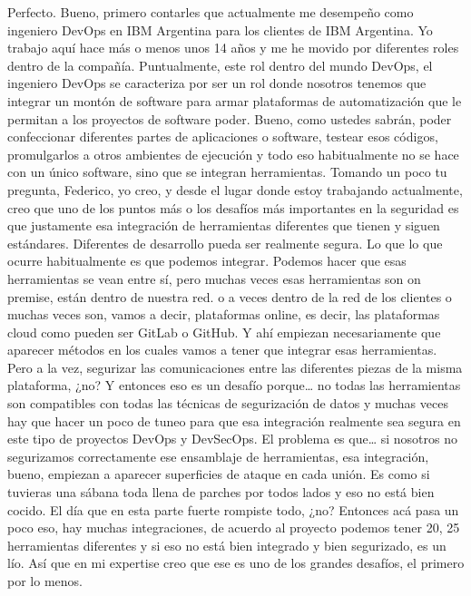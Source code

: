 \begin{description}[leftmargin=0cm, labelsep=0.5cm]
    \item[\textbf{VILLARINO PABLO RODOLFO:}] Perfecto. Bueno, primero contarles que actualmente me desempeño como ingeniero DevOps en IBM Argentina para los clientes de IBM Argentina. Yo trabajo aquí hace más o menos unos 14 años y me he movido por diferentes roles dentro de la compañía. Puntualmente, este rol dentro del mundo DevOps, el ingeniero DevOps se caracteriza por ser un rol donde nosotros tenemos que integrar un montón de software para armar plataformas de automatización que le permitan a los proyectos de software poder. Bueno, como ustedes sabrán, poder confeccionar diferentes partes de aplicaciones o software, testear esos códigos, promulgarlos a otros ambientes de ejecución y todo eso habitualmente no se hace con un único software, sino que se integran herramientas. Tomando un poco tu pregunta, Federico, yo creo, y desde el lugar donde estoy trabajando actualmente, creo que uno de los puntos más o los desafíos más importantes en la seguridad es que justamente esa integración de herramientas diferentes que tienen y siguen estándares. Diferentes de desarrollo pueda ser realmente segura. Lo que lo que ocurre habitualmente es que podemos integrar. Podemos hacer que esas herramientas se vean entre sí, pero muchas veces esas herramientas son on premise, están dentro de nuestra red. o a veces dentro de la red de los clientes o muchas veces son, vamos a decir, plataformas online, es decir, las plataformas cloud como pueden ser GitLab o GitHub. Y ahí empiezan necesariamente que aparecer métodos en los cuales vamos a tener que integrar esas herramientas. Pero a la vez, segurizar las comunicaciones entre las diferentes piezas de la misma plataforma, ¿no? Y entonces eso es un desafío porque… no todas las herramientas son compatibles con todas las técnicas de segurización de datos y muchas veces hay que hacer un poco de tuneo para que esa integración realmente sea segura en este tipo de proyectos DevOps y DevSecOps. El problema es que… si nosotros no segurizamos correctamente ese ensamblaje de herramientas, esa integración, bueno, empiezan a aparecer superficies de ataque en cada unión. Es como si tuvieras una sábana toda llena de parches por todos lados y eso no está bien cocido. El día que en esta parte fuerte rompiste todo, ¿no? Entonces acá pasa un poco eso, hay muchas integraciones, de acuerdo al proyecto podemos tener 20, 25 herramientas diferentes y si eso no está bien integrado y bien segurizado, es un lío. Así que en mi expertise creo que ese es uno de los grandes desafíos, el primero por lo menos.


\end{description}
